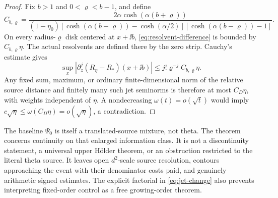 \begin{proof}
Fix \(b>1\) and \(0<\varrho<b-1\), and define
\[
 C_{b,\varrho}=
 \frac{2\alpha\cosh(\alpha(b+\varrho))}
 {(1-\eta_0)
 [\cosh(\alpha(b-\varrho))-\cosh(\alpha/2)]
 [\cosh(\alpha(b-\varrho))-1]}.
\]
On every radius-\(\varrho\) disk centered at \(x+\ii b\),
\eqref{eq:resolvent-difference} is bounded by \(C_{b,\varrho}\eta\).
The actual resolvents are defined there by the zero strip.
Cauchy's estimate gives
\begin{equation}\label{eq:jet-change}
 \sup_x|\partial_z^j(R_\eta-R_*)(x+\ii b)|
 \le j!\varrho^{-j}C_{b,\varrho}\eta.
\end{equation}
Any fixed sum, maximum, or ordinary finite-dimensional norm of the
relative source distance and finitely many such jet seminorms is
therefore at most \(C_D\eta\), with weights independent of \(\eta\).
A nondecreasing \(\omega(t)=o(\sqrt t)\) would imply
\(c\sqrt\eta\le\omega(C_D\eta)=o(\sqrt\eta)\), a contradiction.
\end{proof}

The baseline \(\Psi_0\) is itself a translated-source mixture, not
theta. The theorem concerns continuity on that enlarged information
class. It is not a discontinuity statement, a universal upper
Hölder theorem, or an obstruction restricted to the literal theta
source. It leaves open \(d^2\)-scale source resolution, contours
approaching the event with their denominator costs paid, and genuinely
arithmetic signed estimates. The explicit factorial in
\eqref{eq:jet-change} also prevents interpreting fixed-order
control as a free growing-order theorem.

